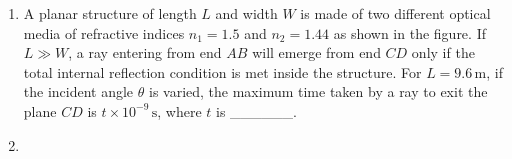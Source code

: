 
\begin{enumerate}
    \item A planar structure of length \( L \) and width \( W \) is made of two different optical media of refractive indices \( n_1 = 1.5 \) and \( n_2 = 1.44 \) as shown in the figure. If \( L \gg W \), a ray entering from end \( AB \) will emerge from end \( CD \) only if the total internal reflection condition is met inside the structure. For \( L = 9.6 \, \text{m} \), if the incident angle \( \theta \) is varied, the maximum time taken by a ray to exit the plane \( CD \) is \( t \times 10^{-9} \, \text{s} \), where \( t \) is \_\_\_\_\_\_.
    \begin{center}
    \end{center}
    \item[\text{[Speed of light \( c = 3 \times 10^8 \, \text{m/s} \)]}]
\end{enumerate}
